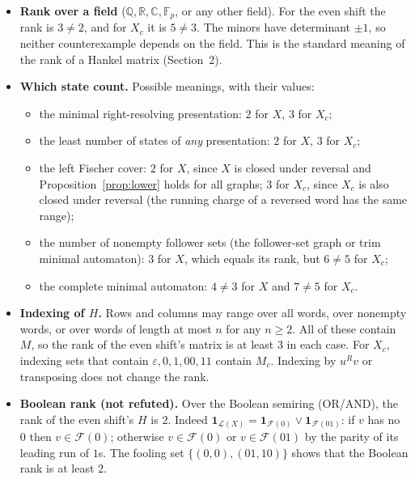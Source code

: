 \documentclass[11pt]{article}
\theoremstyle{definition}
\theoremstyle{remark}
\newcommand{\Lang}{\mathcal{L}}
\newcommand{\F}{\mathcal{F}}
\begin{document}
\begin{itemize}
\item \textbf{Rank over a field} ($\mathbb Q,\mathbb R,\mathbb C,\mathbb F_p$, or any other field).
For the even shift the rank is $3\ne2$, and for $X_c$ it is $5\ne3$. The minors have
determinant $\pm1$, so neither counterexample depends on the field. This is the
standard meaning of the rank of a Hankel matrix (Section~2).
\item \textbf{Which state count.} Possible meanings, with their values:
\begin{itemize}
\item the minimal right-resolving presentation: $2$ for $X$, $3$ for $X_c$;
\item the least number of states of \emph{any} presentation: $2$ for $X$, $3$ for $X_c$;
\item the left Fischer cover: $2$ for $X$, since $X$ is closed under reversal
and Proposition~\ref{prop:lower} holds for all graphs; $3$ for $X_c$, since
$X_c$ is also closed under reversal (the running charge of a reversed word has the same range);
\item the number of nonempty follower sets (the follower-set graph or trim
minimal automaton): $3$ for $X$, which equals its rank, but $6\ne5$ for $X_c$;
\item the complete minimal automaton: $4\ne3$ for $X$ and $7\ne5$ for $X_c$.
\end{itemize}
\item \textbf{Indexing of $H$.} Rows and columns may range over all words, over
nonempty words, or over words of length at most $n$ for any $n\ge2$. All of these
contain $M$, so the rank of the even shift's matrix is at least $3$ in each case.
For $X_c$, indexing sets that contain $\varepsilon,0,1,00,11$ contain $M_c$.
Indexing by $u^{R}v$ or transposing does not change the rank.
\item \textbf{Boolean rank (not refuted).} Over the Boolean semiring (OR/AND), the
rank of the even shift's $H$ is $2$. Indeed $\mathbf 1_{\Lang(X)}=\mathbf 1_{\F(0)}\vee\mathbf 1_{\F(01)}$:
if $v$ has no $0$ then $v\in\F(0)$; otherwise $v\in\F(0)$ or $v\in\F(01)$ by
the parity of its leading run of $1$s. The fooling set $\{(0,0),(01,10)\}$ shows
that the Boolean rank is at least $2$.


\end{itemize}
\end{document}
